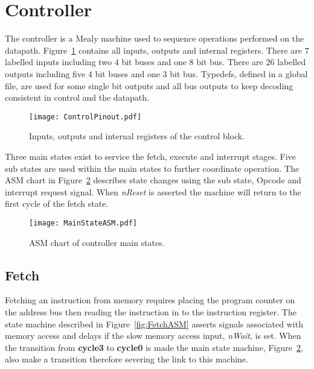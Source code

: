 \section{Controller}

The controller is a Mealy machine used to sequence operations performed on the datapath.
Figure~\ref{fig:ControlBlock} contains all inputs, outputs and internal registers.
There are $7$ labelled inputs including two $4$ bit buses and one $8$ bit bus.
There are $26$ labelled outputs including five $4$ bit buses and one $3$ bit bus.
Typedefs, defined in a global file, are used for some single bit outputs and all bus outputs to keep decoding consistent in control and the datapath. 


\begin{figure}[t]
   \centering
    \texttt{[image: ControlPinout.pdf]}
		\caption{Inputs, outputs and internal registers of the control block.}%
   \label{fig:ControlBlock}
\end{figure}

Three main states exist to service the fetch, execute and interrupt stages.
Five sub states are used within the main states to further coordinate operation.
The ASM chart in Figure~\ref{fig:MainStateASM} describes state changes using the sub state, Opcode and interrupt request signal.   
When \textit{nReset} is asserted the machine will return to the first cycle of the fetch state.



\begin{figure}[ht]
   \centering
    \texttt{[image: MainStateASM.pdf]}
		\caption{ASM chart of controller main states.}
		\label{fig:MainStateASM}
\end{figure}








\subsection{Fetch}

Fetching an instruction from memory requires placing the program counter on the address bus then reading the instruction in to the instruction register. 
The state machine described in Figure~\ref{fig:FetchASM} asserts signals associated with memory access and delays if the slow memory access input, \textit{nWait}, is set.
When the transition from \textbf{cycle3} to \textbf{cycle0} is made the main state machine, Figure~\ref{fig:MainStateASM}, also make a transition therefore severing the link to this machine. 

